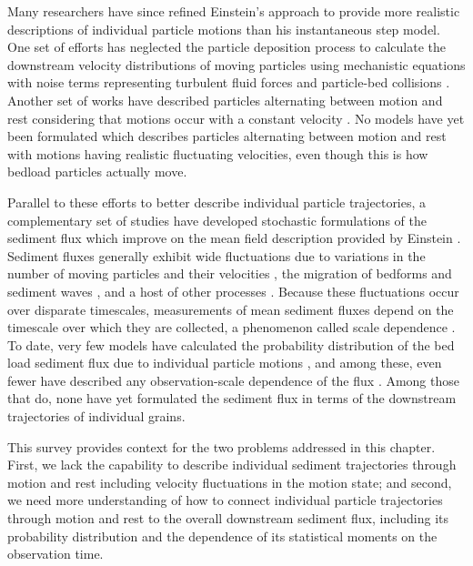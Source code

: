 Many researchers have since refined Einstein's approach to provide more realistic descriptions of individual particle motions than his instantaneous step model.
One set of efforts has neglected the particle deposition process to calculate the downstream velocity distributions of moving particles using mechanistic equations with noise terms representing turbulent fluid forces and particle-bed collisions \citep{Ancey2014,Fan2014}. 
Another set of works have described particles alternating between motion and rest considering that motions occur with a constant velocity \citep{Lisle1998,Lajeunesse2017}. 
No models have yet been formulated which describes particles alternating between motion and rest with motions having realistic fluctuating velocities, even though this is how bedload particles actually move.

Parallel to these efforts to better describe individual particle trajectories, a complementary set of studies have developed stochastic formulations of the sediment flux which improve on the mean field description provided by Einstein \citep{Turowski2010,Furbish2012a,Ancey2020}. 
Sediment fluxes generally exhibit wide fluctuations due to variations in the number of moving particles and their velocities \citep{Bohm2005a,Ancey2006,Furbish2012a}, the migration of bedforms and sediment waves \citep{Guala2014,Recking2012}, and a host of other processes \citep{Dhont2018}.
Because these fluctuations occur over disparate timescales, measurements of mean sediment fluxes depend on the timescale over which they are collected, a phenomenon called scale dependence \citep{Saletti2015,Dhont2018,Singh2009,Turowski2010,Ancey2020}.
To date, very few models have calculated the probability distribution of the bed load sediment flux due to individual particle motions \citep{Ancey2008,Ancey2014}, and among these, even fewer have described any observation-scale dependence of the flux \citep{Ancey2020a,Turowski2010}.
Among those that do, none have yet formulated the sediment flux in terms of the downstream trajectories of individual grains.

This survey provides context for the two problems addressed in this chapter.
First, we lack the capability to describe individual sediment trajectories through motion and rest including velocity fluctuations in the motion state; and second, we need more understanding of how to connect individual particle trajectories through motion and rest to the overall downstream sediment flux, including its probability distribution and the dependence of its statistical moments on the observation time.


